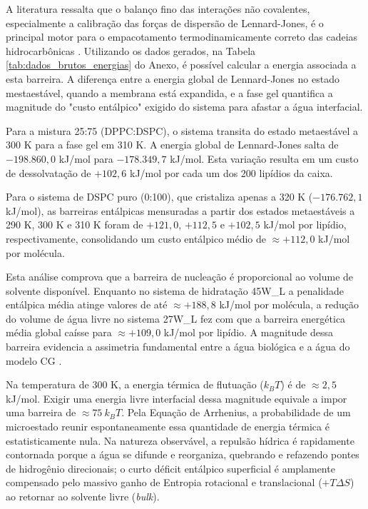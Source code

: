 A literatura ressalta que o balanço fino das interações não covalentes, especialmente a calibração das forças de dispersão de Lennard-Jones, é o principal motor para o empacotamento termodinamicamente correto das cadeias hidrocarbônicas \cite{liu2012}. Utilizando os dados gerados, na Tabela \ref{tab:dados_brutos_energias} do Anexo, é possível calcular a energia associada a esta barreira. A diferença entre a energia global de Lennard-Jones no estado mestaestável, quando a membrana está expandida, e a fase gel quantifica a magnitude do "custo entálpico" exigido do sistema para afastar a água interfacial.

Para a mistura 25:75 (DPPC:DSPC), o sistema transita do estado metaestável a 300 K para a fase gel em 310 K. A energia global de Lennard-Jones salta de $-198.860,0$ kJ/mol para $-178.349,7$ kJ/mol. Esta variação resulta em um custo de dessolvatação de $+102,6$ kJ/mol por cada um dos 200 lipídios da caixa. 

Para o sistema de DSPC puro (0:100), que cristaliza apenas a 320 K ($-176.762,1$ kJ/mol), as barreiras entálpicas mensuradas a partir dos estados metaestáveis a 290 K, 300 K e 310 K foram de $+121,0$, $+112,5$ e $+102,5$ kJ/mol por lipídio, respectivamente, consolidando um custo entálpico médio de $\approx +112,0$ kJ/mol por molécula.

Esta análise comprova que a barreira de nucleação é proporcional ao volume de solvente disponível. Enquanto no sistema de hidratação 45W\_L a penalidade entálpica média atinge valores de até $\approx +188,8$ kJ/mol por molécula, a redução do volume de água livre no sistema 27W\_L fez com que a barreira energética média global caísse para $\approx +109,0$ kJ/mol por lipídio. A magnitude dessa barreira evidencia a assimetria fundamental entre a água biológica e a água do modelo CG \cite{ref_langmuir_2024}. 

Na temperatura de 300 K, a energia térmica de flutuação ($k_B T$) é de $\approx 2,5$ kJ/mol. Exigir uma energia livre interfacial dessa magnitude equivale a impor uma barreira de $\approx 75 \ k_B T$. Pela Equação de Arrhenius, a probabilidade de um microestado reunir espontaneamente essa quantidade de energia térmica é estatisticamente nula. Na natureza observável, a repulsão hídrica é rapidamente contornada porque a água se difunde e reorganiza, quebrando e refazendo pontes de hidrogênio direcionais; o curto déficit entálpico superficial é amplamente compensado pelo massivo ganho de Entropia rotacional e translacional ($+T\Delta S$) ao retornar ao solvente livre (\textit{bulk}). 

